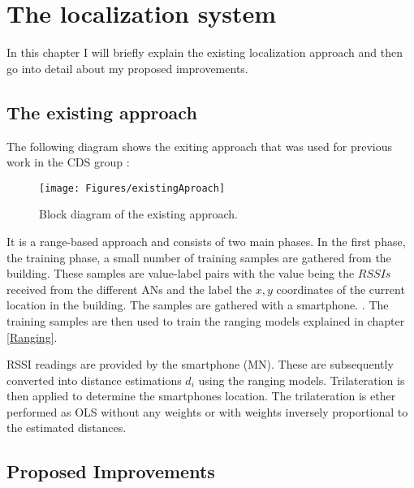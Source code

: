 \chapter{The localization system} %

\label{Chapter3} %

In this chapter I will briefly explain the existing localization approach and then go into detail about my proposed improvements.

\section{The existing approach}

The following diagram shows the exiting approach that was used for previous work in the CDS group \cite{josePaper}:

\begin{figure}[ht]
\centering
\texttt{[image: Figures/existingAproach]}
\decoRule
\caption[The existing approach]{Block diagram of the existing approach.}
\label{fig:existingApproach}
\end{figure}

It is a range-based approach and consists of two main phases. In the first phase, the training phase, a small number of training samples are gathered from the building. These samples are value-label pairs with the value being the \(RSSIs\) received from the different ANs and the label the \(x,y\) coordinates of the current location in the building. The samples are gathered with a smartphone. . The training samples are then used to train the ranging models explained in chapter \ref{Ranging}.

 RSSI readings are provided by the smartphone (MN). These are subsequently converted into distance estimations \(d_i\)  using the ranging models. Trilateration is then applied to determine the smartphones location. The trilateration is ether performed as OLS without any weights or with weights inversely proportional to the estimated distances.

\section{Proposed Improvements}

